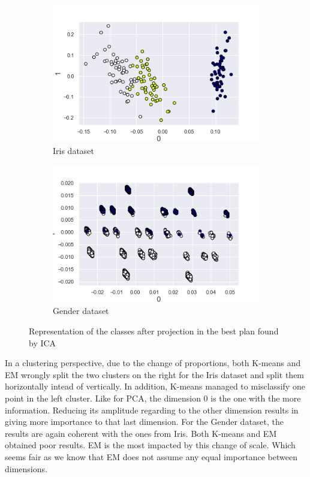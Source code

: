 \documentclass[twocolumn, 10pt]{article}
\begin{document}
			\begin{figure}[h]
				\centering
				\begin{subfigure}[t]{0.49\columnwidth}
					\centering
					\includegraphics[width=\linewidth]{../graphics/ica_iris_0_1_label.png}
					\caption{Iris dataset}
					\label{fig:ica_iris}
				\end{subfigure}
				\begin{subfigure}[t]{0.49\columnwidth}
					\centering
					\includegraphics[width=\linewidth]{../graphics/ica_g_0_1_label.png}
					\caption{Gender dataset}
					\label{fig:ica_g}
				\end{subfigure}
				\caption{Representation of the classes after projection in the best plan found by ICA}
				\label{fig:ica}
			\end{figure}

			In a clustering perspective, due to the change of proportions, both K-means and EM wrongly split the two clusters on the right for the Iris dataset and split them horizontally intead of vertically. In addition, K-means managed to misclassify one point in the left cluster. Like for PCA, the dimension 0 is the one with the more information. Reducing its amplitude regarding to the other dimension results in giving more importance to that last dimension. For the Gender dataset, the results are again coherent with the ones from Iris. Both K-means and EM obtained poor results. EM is the most impacted by this change of scale. Which seems fair as we know that EM does not assume any equal importance between dimensions.
\end{document}
